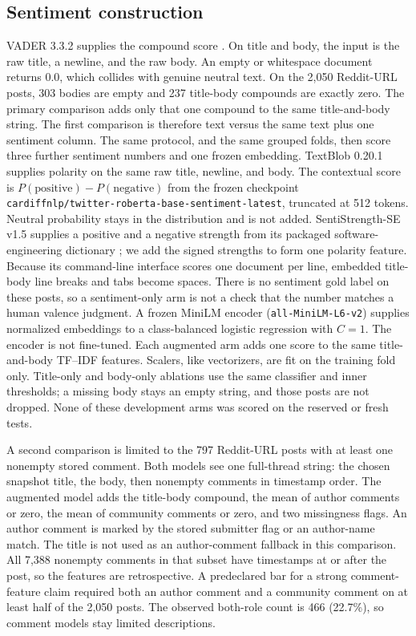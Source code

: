 \documentclass[conference,letterpaper]{IEEEtran}
\begin{document}
\subsection{Sentiment construction}
VADER 3.3.2 supplies the compound score \cite{Hutto2014VADER}. On title and body, the input is the raw title, a newline, and the raw body. An empty or whitespace document returns 0.0, which collides with genuine neutral text. On the 2,050 Reddit-URL posts, 303 bodies are empty and 237 title-body compounds are exactly zero. The primary comparison adds only that one compound to the same title-and-body string. The first comparison is therefore text versus the same text plus one sentiment column. The same protocol, and the same grouped folds, then score three further sentiment numbers and one frozen embedding. TextBlob 0.20.1 supplies polarity on the same raw title, newline, and body. The contextual score is $P(\mathrm{positive})-P(\mathrm{negative})$ from the frozen checkpoint \texttt{cardiffnlp/\allowbreak twitter-roberta-\allowbreak base-sentiment-latest}, truncated at 512 tokens. Neutral probability stays in the distribution and is not added. SentiStrength-SE v1.5 supplies a positive and a negative strength from its packaged software-engineering dictionary \cite{SentiStrengthSETool}; we add the signed strengths to form one polarity feature. Because its command-line interface scores one document per line, embedded title-body line breaks and tabs become spaces. There is no sentiment gold label on these posts, so a sentiment-only arm is not a check that the number matches a human valence judgment. A frozen MiniLM encoder (\texttt{all-MiniLM-L6-v2}) supplies normalized embeddings to a class-balanced logistic regression with $C=1$. The encoder is not fine-tuned. Each augmented arm adds one score to the same title-and-body TF--IDF features. Scalers, like vectorizers, are fit on the training fold only. Title-only and body-only ablations use the same classifier and inner thresholds; a missing body stays an empty string, and those posts are not dropped. None of these development arms was scored on the reserved or fresh tests.

A second comparison is limited to the 797 Reddit-URL posts with at least one nonempty stored comment. Both models see one full-thread string: the chosen snapshot title, the body, then nonempty comments in timestamp order. The augmented model adds the title-body compound, the mean of author comments or zero, the mean of community comments or zero, and two missingness flags. An author comment is marked by the stored submitter flag or an author-name match. The title is not used as an author-comment fallback in this comparison. All 7,388 nonempty comments in that subset have timestamps at or after the post, so the features are retrospective. A predeclared bar for a strong comment-feature claim required both an author comment and a community comment on at least half of the 2,050 posts. The observed both-role count is 466 (22.7\%), so comment models stay limited descriptions.
\end{document}
